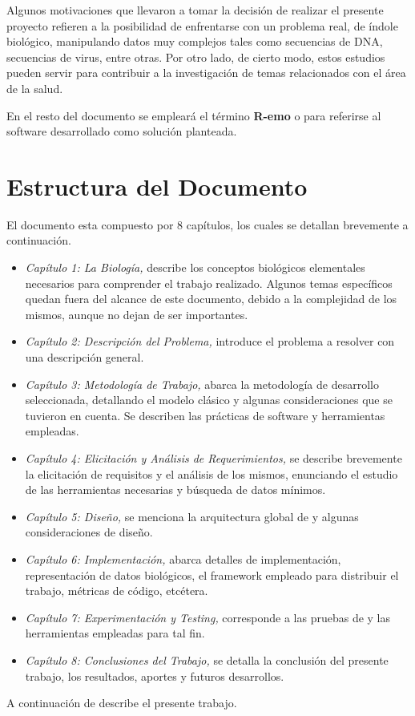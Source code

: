 \par Algunos motivaciones que llevaron a tomar la decisión de realizar el presente proyecto refieren a la posibilidad de enfrentarse con un problema real, de índole biológico, manipulando datos muy complejos tales como secuencias de DNA, secuencias de virus, entre otras. Por otro lado, de cierto modo, 
estos estudios pueden servir para contribuir a la investigación de temas relacionados con el área de la salud.

\par En el resto del documento se empleará el término \textbf{R-emo} o \remo para referirse al software desarrollado como solución planteada.

\section*{Estructura del Documento}
El documento esta compuesto por 8 capítulos, los cuales se detallan brevemente a continuación. 
\begin{itemize}
    \item \emph{Capítulo 1: La Biología,} describe los conceptos biológicos elementales necesarios para comprender el trabajo realizado. Algunos temas específicos quedan fuera del alcance de este documento, debido a la complejidad de los mismos, aunque no dejan de ser importantes.
    \item \emph{Capítulo 2: Descripción del Problema,} introduce el problema a resolver con una descripción general. 
    \item \emph{Capítulo 3: Metodología de Trabajo,} abarca la metodología de desarrollo seleccionada, detallando el modelo clásico y algunas consideraciones que se tuvieron en cuenta. Se describen las prácticas de software y herramientas empleadas.    
    \item \emph{Capítulo 4: Elicitación y Análisis de Requerimientos,} se describe brevemente la elicitación de requisitos y el análisis de los mismos, enunciando el estudio de las herramientas necesarias y búsqueda de datos mínimos.
    \item \emph{Capítulo 5: Diseño,} se menciona la arquitectura global de \remo y algunas consideraciones de diseño. 
    \item \emph{Capítulo 6: Implementación,} abarca detalles de implementación, representación de datos biológicos, el framework empleado para distribuir el trabajo, métricas de código, etcétera.
    \item \emph{Capítulo 7: Experimentación y Testing,} corresponde a las pruebas de \remo y las herramientas empleadas para tal fin.
    \item \emph{Capítulo 8: Conclusiones del Trabajo,} se detalla la conclusión del presente trabajo, los resultados, aportes y futuros desarrollos.    
\end{itemize}
A continuación de describe el presente trabajo.